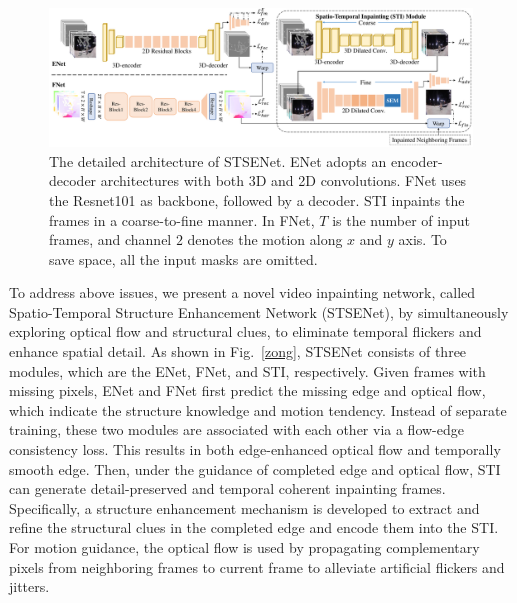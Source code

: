\begin{figure}[t]
	\centering
	\includegraphics[width=2.0\columnwidth]{sti} %
	\caption{The detailed architecture of STSENet. ENet adopts an encoder-decoder architectures with both 3D and 2D convolutions. FNet uses the Resnet101 as backbone, followed by a decoder. STI inpaints the frames in a coarse-to-fine manner. In FNet, $T$ is the number of input frames, and channel $2$ denotes the motion along $x$ and $y$ axis. To save space, all the input masks are omitted.}
	\label{fig:stiNet}
\end{figure}
To address above issues, we present a novel video inpainting network, called Spatio-Temporal Structure Enhancement Network (STSENet), by simultaneously exploring optical flow and structural clues, to eliminate temporal flickers and enhance spatial detail. 
As shown in Fig.~\ref{zong}, STSENet consists of three modules, which are the ENet, FNet, and STI, respectively.
Given frames with missing pixels, ENet and FNet first predict the missing edge and optical flow, which indicate the structure knowledge and motion tendency.
Instead of separate training, these two modules are associated with each other via a flow-edge consistency loss.
This results in both edge-enhanced optical flow and temporally smooth edge.
Then, under the guidance of completed edge and optical flow, STI can generate detail-preserved and temporal coherent inpainting frames.
Specifically, a structure enhancement mechanism is developed to extract and refine the structural clues in the completed edge and encode them into the STI.
For motion guidance, the optical flow is used by propagating complementary pixels from neighboring frames to current frame to alleviate artificial flickers and jitters.

